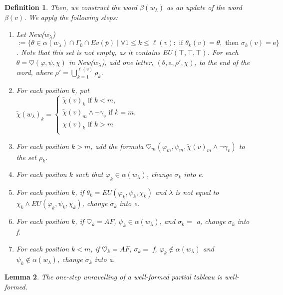 \documentclass[11pt]{article}
\newtheorem{definition}{Definition}[section]
\newtheorem{lemma}[definition]{Lemma}
\begin{document}
\begin{definition}
    Then, we construct the word $\beta(w_\lambda)$ as an update of the word $\beta(v)$. We apply the following steps:
    \begin{enumerate}
        \item Let New($w_\lambda$) $:=\{\theta\in\alpha(w_\lambda)\cap\Gamma_0\cap Ev(\bar{p})\mid\forall 1\leq k\leq \ell(v):\mbox{ if }\theta_k(v)=\theta, \mbox{ then }\sigma_k(v)=\mbox{e}\}$. Note that this set is not empty, as it contains $EU(\top,\top,\top)$. For each $\theta=\heartsuit(\varphi,\psi,\chi)$ in New($w_\lambda$), add one letter, $(\theta,\mbox{a},\rho',\chi)$, to the end of the word, where $\rho'=\bigcup_{k=1}^{\ell(v)}\rho_k$.
        \item For each position $k$, put \\ $\tilde{\chi}(w_\lambda)_k=\begin{cases}
            \tilde{\chi}(v)_k \mbox{ if } k<m,\\
            \tilde{\chi}(v)_m\wedge\neg\gamma_v \mbox{ if } k=m,\\
            \chi(v)_k \mbox{ if } k>m\\
        \end{cases}$
        \item For each position $k>m$, add the formula $\heartsuit_m(\varphi_m,\psi_m,\tilde{\chi}(v)_m\wedge\neg\gamma_v)$ to the set $\rho_k$.
        \item For each positon $k$ such that $\varphi_k\in\alpha(w_\lambda)$, change $\sigma_k$ into e.
        \item For each position $k$, if $\theta_k = EU(\varphi_k,\psi_k,\chi_k)$ and $\lambda$ is not equal to $\chi_k\wedge EU(\varphi_k,\psi_k,\chi_k)$, change $\sigma_k$ into e.
        \item For each position $k$, if $\heartsuit_k = AF$, $\psi_k\in\alpha(w_\lambda)$, and $\sigma_k =$ a, change $\sigma_k$ into f.
        \item For each position $k<m$, if $\heartsuit_k = AF$, $\sigma_k=$ f, $\varphi_k\notin\alpha(w_\lambda)$ and $\psi_k\notin\alpha(w_\lambda)$, change $\sigma_k$ into a.
    \end{enumerate}
\end{definition}
\begin{lemma}\label{unravelling_wf}
    The one-step unravelling of a well-formed partial tableau is well-formed.
\end{lemma}
\end{document}
